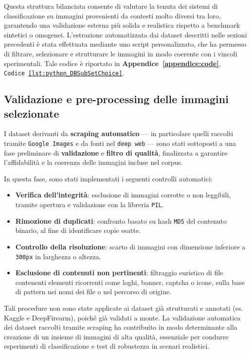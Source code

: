 Questa struttura bilanciata consente di valutare la tenuta dei sistemi di classificazione su immagini provenienti da contesti molto diversi tra loro, garantendo una validazione esterna più solida e realistica rispetto a benchmark sintetici o omogenei. L'estrazione automatizzata dai dataset descritti nelle sezioni precedenti è stata effettuata mediante uno script personalizzato, che ha permesso di filtrare, selezionare e strutturare le immagini in modo coerente con i vincoli sperimentali.
Tale codice è riportato in \textbf{Appendice~\ref{appendice:code}}, \texttt{Codice~\ref{lst:python_DBSubSetChoice}}.







\subsection*{Validazione e pre-processing delle immagini selezionate}
I dataset derivanti da \textbf{scraping automatico} — in particolare quelli raccolti tramite \texttt{Google Images} e da fonti nel \texttt{deep web} — sono stati sottoposti a una fase preliminare di \textbf{validazione} e \textbf{filtro di qualità}, finalizzata a garantire l'affidabilità e la coerenza delle immagini incluse nel corpus.

In questa fase, sono stati implementati i seguenti controlli automatici:

\begin{itemize}
    \item \textbf{Verifica dell'integrità}: esclusione di immagini corrotte o non leggibili, tramite apertura e validazione con la libreria \texttt{PIL}.
    \item \textbf{Rimozione di duplicati}: confronto basato su hash \texttt{MD5} del contenuto binario, al fine di identificare copie esatte.
    \item \textbf{Controllo della risoluzione}: scarto di immagini con dimensione inferiore a \texttt{300px} in larghezza o altezza.
    \item \textbf{Esclusione di contenuti non pertinenti}: filtraggio euristico di file contenenti elementi ricorrenti come loghi, banner, captcha o icone, sulla base di pattern nei nomi dei file o nel percorso di origine.
\end{itemize}

Tali procedure non sono state applicate ai dataset già strutturati e annotati (es. Kaggle e DeepFirearm), poiché già validati a monte. La validazione automatica dei dataset raccolti tramite scraping ha contribuito in modo determinante alla creazione di un insieme di immagini di alta qualità, essenziale per condurre esperimenti di classificazione e test di robustezza in scenari realistici.






